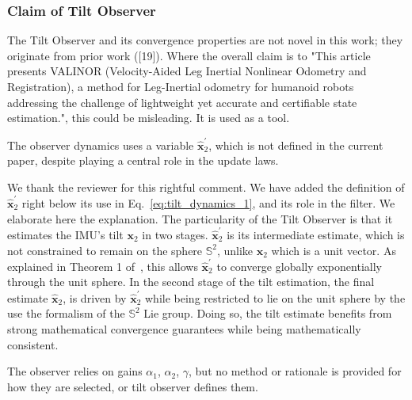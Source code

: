 
\subsubsection{Claim of Tilt Observer}

\begin{revquote}
The Tilt Observer and its convergence properties are not novel in this work; they originate from prior work ([19]). Where the overall claim is to "This article presents VALINOR (Velocity-Aided Leg Inertial Nonlinear Odometry and Registration), a method for Leg-Inertial odometry for humanoid robots addressing the challenge of lightweight yet accurate and certifiable state estimation.", this could be misleading. It is used as a tool.
\end{revquote}

\begin{revquote}
The observer dynamics uses a variable $\hat{\boldsymbol{x}}_{2}^{\prime} $, which is not defined in the current paper, despite playing a central role in the update laws.
\end{revquote}

We thank the reviewer for this rightful comment. We have added the definition of $\hat{\boldsymbol{x}}_{2}^{\prime} $ right below its use in Eq.~\eqref{eq:tilt_dynamics_1}, and its role in the filter. We elaborate here the explanation.
The particularity of the Tilt Observer is that it estimates the IMU's tilt $\boldsymbol{x}_{2}$ in two stages. $\hat{\boldsymbol{x}}_{2}^{\prime} $ is its intermediate estimate, which is not constrained to remain on the sphere $\mathbb{S}^{2}$, unlike $\boldsymbol{x}_{2}$ which is a unit vector. As explained in Theorem 1 of~\cite{benallegue2020LyapunovStableOrientationEstimatorHumanoids}, this allows $\hat{\boldsymbol{x}}_{2}^{\prime} $ to converge globally exponentially through the unit sphere. In the second stage of the tilt estimation, the final estimate $\hat{\boldsymbol{x}}_{2}$, is driven by $\hat{\boldsymbol{x}}_{2}^{\prime}$ while being restricted to lie on the unit sphere by the use the formalism of the $\mathbb{S}^{2}$ Lie group. Doing so, the tilt estimate benefits from strong mathematical convergence guarantees while being mathematically consistent.


\begin{revquote}
The observer relies on gains $\alpha_{1}$, $\alpha_{2}$, $\gamma$, but no method or rationale is provided for how they are selected, or tilt observer defines them.
\end{revquote}

